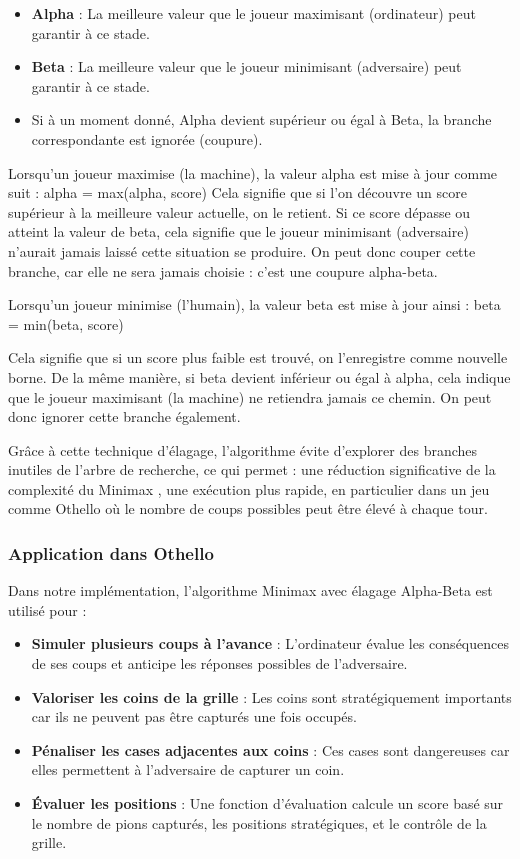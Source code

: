 \documentclass[a4paper,12pt]{article}
\begin{document}
\begin{itemize}
    \item \textbf{Alpha} : La meilleure valeur que le joueur maximisant (ordinateur) peut garantir à ce stade.
    \item \textbf{Beta} : La meilleure valeur que le joueur minimisant (adversaire) peut garantir à ce stade.
    \item Si à un moment donné, Alpha devient supérieur ou égal à Beta, la branche correspondante est ignorée (coupure).
\end{itemize}

Lorsqu’un joueur maximise (la machine), la valeur alpha est mise à jour comme suit :
alpha = max(alpha, score)
Cela signifie que si l’on découvre un score supérieur à la meilleure valeur actuelle, on le retient.
Si ce score dépasse ou atteint la valeur de beta, cela signifie que le joueur minimisant (adversaire) n’aurait jamais laissé cette situation se produire. On peut donc couper cette branche, car elle ne sera jamais choisie : c’est une coupure alpha-beta.

Lorsqu’un joueur minimise (l’humain), la valeur beta est mise à jour ainsi :
beta = min(beta, score)

Cela signifie que si un score plus faible est trouvé, on l’enregistre comme nouvelle borne.
De la même manière, si beta devient inférieur ou égal à alpha, cela indique que le joueur maximisant (la machine) ne retiendra jamais ce chemin. On peut donc ignorer cette branche également.

Grâce à cette technique d’élagage, l'algorithme évite d'explorer des branches inutiles de l’arbre de recherche, ce qui permet :
une réduction significative de la complexité du Minimax ,
une exécution plus rapide, en particulier dans un jeu comme Othello où le nombre de coups possibles peut être élevé à chaque tour.

\subsubsection{Application dans Othello}
Dans notre implémentation, l'algorithme Minimax avec élagage Alpha-Beta est utilisé pour :
\begin{itemize}
    \item \textbf{Simuler plusieurs coups à l'avance} : L'ordinateur évalue les conséquences de ses coups et anticipe les réponses possibles de l'adversaire.
    \item \textbf{Valoriser les coins de la grille} : Les coins sont stratégiquement importants car ils ne peuvent pas être capturés une fois occupés.
    \item \textbf{Pénaliser les cases adjacentes aux coins} : Ces cases sont dangereuses car elles permettent à l'adversaire de capturer un coin.
    \item \textbf{Évaluer les positions} : Une fonction d'évaluation calcule un score basé sur le nombre de pions capturés, les positions stratégiques, et le contrôle de la grille.
\end{itemize}
\end{document}
